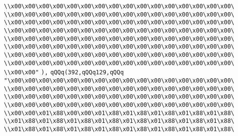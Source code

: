 \verb|\\x00\x00\x00\x00\x00\x00\x00\x00\x00\x00\x00\x00\x00\x00\x00\x00\|\newline
\verb|\\x00\x00\x00\x00\x00\x00\x00\x00\x00\x00\x00\x00\x00\x00\x00\x00\|\newline
\verb|\\x00\x00\x00\x00\x00\x00\x00\x00\x00\x00\x00\x00\x00\x00\x00\x00\|\newline
\verb|\\x00\x00\x00\x00\x00\x00\x00\x00\x00\x00\x00\x00\x00\x00\x00\x00\|\newline
\verb|\\x00\x00\x00\x00\x00\x00\x00\x00\x00\x00\x00\x00\x00\x00\x00\x00\|\newline
\verb|\\x00\x00\x00\x00\x00\x00\x00\x00\x00\x00\x00\x00\x00\x00\x00\x00\|\newline
\verb|\\x00\x00\x00\x00\x00\x00\x00\x00\x00\x00\x00\x00\x00\x00\x00\x00\|\newline
\verb|\\x00\x00\x00\x00\x00\x00\x00\x00\x00\x00\x00\x00\x00\x00\x00\x00\|\newline
\verb|\\x00\x00"|\newline
\verb|),|\newline
\verb|qQQq(392,qQQq129,qQQq|\newline
\verb|"\x00\x00\x00\x00\x00\x00\x00\x00\x00\x00\x00\x00\x00\x00\x00\x00\|\newline
\verb|\\x00\x00\x00\x00\x00\x00\x00\x00\x00\x00\x00\x00\x00\x00\x00\x00\|\newline
\verb|\\x00\x00\x00\x00\x00\x00\x00\x00\x00\x00\x00\x00\x00\x00\x00\x00\|\newline
\verb|\\x00\x00\x00\x00\x00\x00\x00\x00\x00\x00\x00\x00\x00\x00\x00\x00\|\newline
\verb|\\x00\x00\x01\x88\x00\x00\x01\x88\x01\x88\x01\x88\x01\x88\x01\x88\|\newline
\verb|\\x01\x88\x01\x88\x01\x88\x01\x88\x01\x88\x01\x88\x01\x88\x01\x88\|\newline
\verb|\\x01\x88\x01\x88\x01\x88\x01\x88\x01\x88\x01\x88\x01\x88\x01\x88\|\newline
